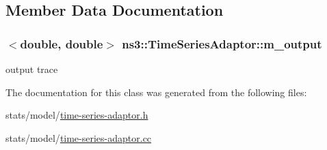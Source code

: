 \subsection{Member Data Documentation}
\subsubsection[{\texorpdfstring{m\+\_\+output}{m_output}}]{$<$double, double$>$ ns3\+::\+Time\+Series\+Adaptor\+::m\+\_\+output\hspace{0.3cm}{\ttfamily [private]}}\hypertarget{classns3_1_1TimeSeriesAdaptor_a83bca39fca2550dcd342f8510161267e}{}\label{classns3_1_1TimeSeriesAdaptor_a83bca39fca2550dcd342f8510161267e}


output trace 



The documentation for this class was generated from the following files\+:\begin{DoxyCompactItemize}
\item 
stats/model/\hyperlink{time-series-adaptor_8h}{time-\/series-\/adaptor.\+h}\item 
stats/model/\hyperlink{time-series-adaptor_8cc}{time-\/series-\/adaptor.\+cc}\end{DoxyCompactItemize}
